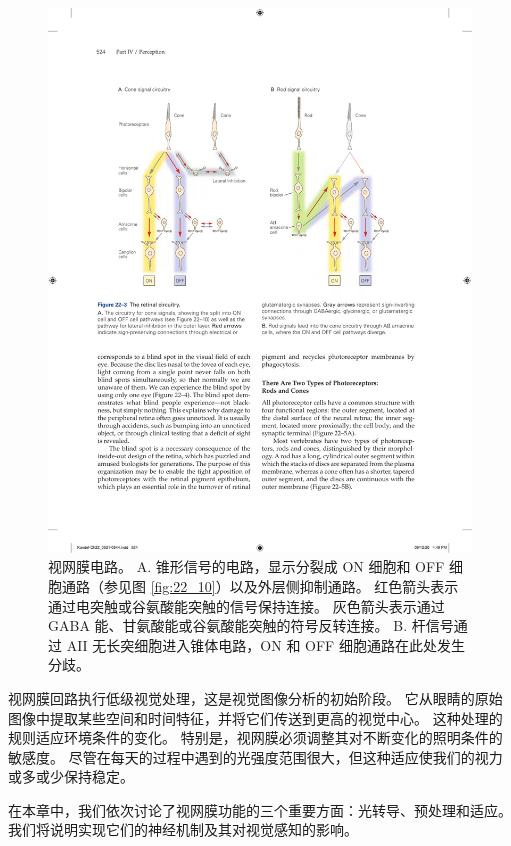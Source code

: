 \begin{figure}[htbp]
	\centering
	\includegraphics[width=1.0\linewidth]{chap22/fig_22_3}
	\caption{视网膜电路。 
		A. 锥形信号的电路，显示分裂成 ON 细胞和 OFF 细胞通路（参见图 \ref{fig:22_10}）以及外层侧抑制通路。 
		红色箭头表示通过电突触或谷氨酸能突触的信号保持连接。 
		灰色箭头表示通过 GABA 能、甘氨酸能或谷氨酸能突触的符号反转连接。 
		B. 杆信号通过 AII 无长突细胞进入锥体电路，ON 和 OFF 细胞通路在此处发生分歧。}
	\label{fig:22_3}
\end{figure}

视网膜回路执行低级视觉处理，这是视觉图像分析的初始阶段。 
它从眼睛的原始图像中提取某些空间和时间特征，并将它们传送到更高的视觉中心。 
这种处理的规则适应环境条件的变化。 
特别是，视网膜必须调整其对不断变化的照明条件的敏感度。 
尽管在每天的过程中遇到的光强度范围很大，但这种适应使我们的视力或多或少保持稳定。


在本章中，我们依次讨论了视网膜功能的三个重要方面：光转导、预处理和适应。 
我们将说明实现它们的神经机制及其对视觉感知的影响。




